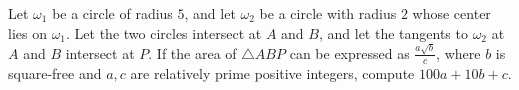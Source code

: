 Let $\omega_1$ be a circle of radius $5$, and let $\omega_2$ be a circle with radius $2$ whose center lies on $\omega_1$. Let the two circles intersect at $A$ and $B$, and let the tangents to $\omega_2$ at $A$ and $B$ intersect at $P$. If the area of $\triangle ABP$ can be expressed as $\frac{a\sqrt{b}}{c}$, where $b$ is square-free and $a, c$ are relatively prime positive integers, compute $100a + 10b + c$.
